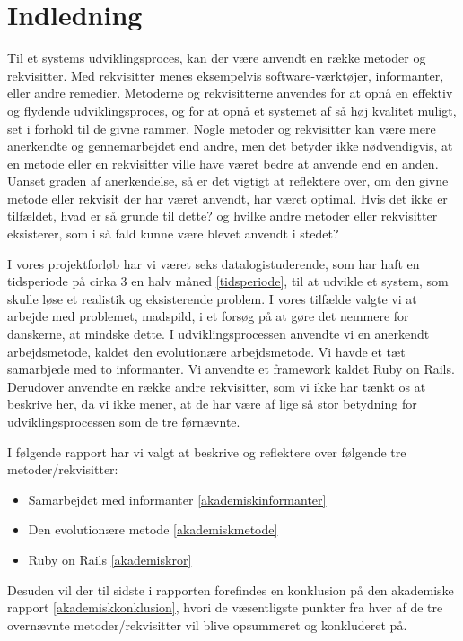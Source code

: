 \chapter{Indledning}

Til et systems udviklingsproces, kan der være anvendt en række metoder og rekvisitter. Med rekvisitter menes eksempelvis software-værktøjer, informanter, eller andre remedier. Metoderne og rekvisitterne anvendes for at opnå en effektiv og flydende udviklingsproces, og for at opnå et systemet af så høj kvalitet muligt, set i forhold til de givne rammer. Nogle metoder og rekvisitter kan være mere anerkendte og gennemarbejdet end andre, men det betyder ikke nødvendigvis, at en metode eller en rekvisitter ville have været bedre at anvende end en anden. Uanset graden af anerkendelse, så er det vigtigt at reflektere over, om den givne metode eller rekvisit der har været anvendt, har været optimal. Hvis det ikke er tilfældet, hvad er så grunde til dette? og hvilke andre metoder eller rekvisitter eksisterer, som i så fald kunne være blevet anvendt i stedet?

I vores projektforløb har vi været seks datalogistuderende, som har haft en tidsperiode på cirka 3 en halv måned \ref{tidsperiode}, til at udvikle et system, som skulle løse et realistik og eksisterende problem. I vores tilfælde valgte vi at arbejde med problemet, madspild, i et forsøg på at gøre det nemmere for danskerne, at mindske dette. I udviklingsprocessen anvendte vi en anerkendt arbejdsmetode, kaldet den evolutionære arbejdsmetode. Vi havde et tæt samarbjede med to informanter. Vi anvendte et framework kaldet Ruby on Rails. Derudover anvendte en række andre rekvisitter, som vi ikke har tænkt os at beskrive her, da vi ikke mener, at de har være af lige så stor betydning for udviklingsprocessen som de tre førnævnte.

I følgende rapport har vi valgt at beskrive og reflektere over følgende tre metoder/rekvisitter:

\begin{itemize}[noitemsep]
  \item Samarbejdet med informanter \ref{akademiskinformanter}
  \item Den evolutionære metode \ref{akademiskmetode}
  \item Ruby on Rails \ref{akademiskror}
\end{itemize}

Desuden vil der til sidste i rapporten forefindes en konklusion på den akademiske rapport \ref{akademiskkonklusion}, hvori de væsentligste punkter fra hver af de tre overnævnte metoder/rekvisitter vil blive opsummeret og konkluderet på.





